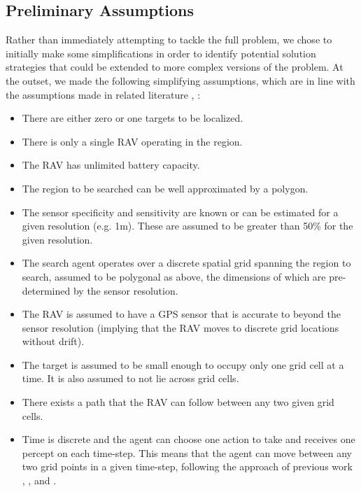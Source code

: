 \subsection{Preliminary Assumptions}\label{subsec:initalAssumptions}

Rather than immediately attempting to tackle the full problem, we chose to initially make some simplifications in order to identify potential solution strategies that could be extended to more complex versions of the problem. At the outset, we made the following simplifying assumptions, which are in line with the assumptions made in related literature \cite{Chung2007ASearch}, \cite{Chung2008Multi-agentFramework}:
\begin{itemize}
    \item There are either zero or one targets to be localized.
    \item There is only a single RAV operating in the region.
    \item The RAV has unlimited battery capacity.
    \item The region to be searched can be well approximated by a polygon.
    \item The sensor specificity and sensitivity are known or can be estimated for a given resolution (e.g. 1m). These are assumed to be greater than 50\% for the given resolution.
    \item The search agent operates over a discrete spatial grid spanning the region to search, assumed to be polygonal as above, the dimensions of which are pre-determined by the sensor resolution.
    \item The RAV is assumed to have a GPS sensor that is accurate to beyond the sensor resolution (implying that the RAV moves to discrete grid locations without drift).
    \item The target is assumed to be small enough to occupy only one grid cell at a time. It is also assumed to not lie across grid cells.
    \item There exists a path that the RAV can follow between any two given grid cells.
    \item Time is discrete and the agent can choose one action to take and receives one percept on each time-step. This means that the agent can move between any two grid points in a given time-step, following the approach of previous work \cite{Chung2007ASearch}, \cite{Chung2008Multi-agentFramework}, \cite{Kriheli2016OptimalInspections} and \cite{Waharte2009CoordinatedUAVs}.
\end{itemize}
